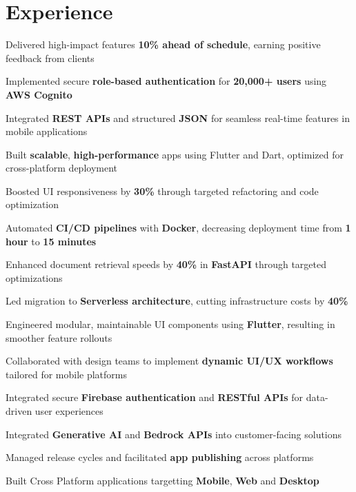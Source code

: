 \documentclass[]{deedy-resume-reversed}
\begin{document}
\begin{minipage}[t]{0.60\textwidth}

\section{Experience}

\vspace{\topsep}
\begin{tightemize}
\item Delivered high-impact features \textbf{10\% ahead of schedule}, earning positive feedback from clients
\item Implemented secure \textbf{role-based authentication} for \textbf{20,000+ users} using \textbf{AWS Cognito}
\item Integrated \textbf{REST APIs} and structured \textbf{JSON} for seamless real-time features in mobile applications
\item Built \textbf{scalable}, \textbf{high-performance} apps using Flutter and Dart, optimized for cross-platform deployment
\item Boosted UI responsiveness by \textbf{30\%} through targeted refactoring and code optimization
\item Automated \textbf{CI/CD pipelines} with \textbf{Docker}, decreasing deployment time from \textbf{1 hour} to \textbf{15 minutes}
\item Enhanced document retrieval speeds by \textbf{40\%} in \textbf{FastAPI} through targeted optimizations
\item Led migration to \textbf{Serverless architecture}, cutting infrastructure costs by \textbf{40\%}
\end{tightemize}

\begin{tightemize}
\item Engineered modular, maintainable UI components using \textbf{Flutter}, resulting in smoother feature rollouts
\item Collaborated with design teams to implement \textbf{dynamic UI/UX workflows} tailored for mobile platforms
\item Integrated secure \textbf{Firebase authentication} and \textbf{RESTful APIs} for data-driven user experiences
\item Integrated \textbf{Generative AI} and \textbf{Bedrock APIs} into customer-facing solutions
\item Managed release cycles and facilitated \textbf{app publishing} across platforms
\item Built Cross Platform applications targetting \textbf{Mobile}, \textbf{Web} and \textbf{Desktop}
\end{tightemize}
\sectionsep


\end{minipage}
\end{document}
